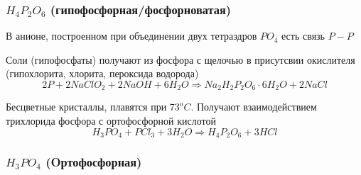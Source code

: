 \documentclass[11pt]{article}
\begin{document}
\subsubsection{$H_4P_2O_6$ (гипофосфорная/фосфорноватая)} 
В анионе, построенном при объединении двух тетраэдров $PO_4$ есть связь $P-P$

Соли (гипофосфаты) получают из фосфора с щелочью в присутсвии окислителя (гипохлорита, хлорита, пероксида водорода)
$$2P + 2NaClO_2 + 2NaOH + 6H_2O \Rightarrow Na_2H_2P_2O_6 \cdot 6H_2O + 2NaCl$$ 

Бесцветные кристаллы, плавятся при $73^oC$. Получают взаимодействием трихлорида фосфора с ортофосфорной кислотой
$$H_3PO_4 + PCl_3 + 3H_2O \Rightarrow H_4P_2O_6 + 3HCl$$

\subsubsection{$H_3PO_4$ (Oртофосфорная)}
\end{document}
